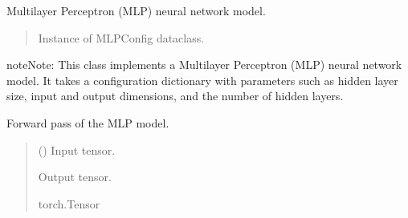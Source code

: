 \documentclass[letterpaper,10pt,english]{sphinxmanual}
\begin{document}
\begin{fulllineitems}
\label{\detokenize{api:hypyml.models.MLP}}
\pysigstartsignatures
{}
\pysigstopsignatures
\sphinxAtStartPar
Multilayer Perceptron (MLP) neural network model.

\begin{fulllineitems}
\label{\detokenize{api:hypyml.models.MLP.config}}
\pysigstartsignatures
{}
\pysigstopsignatures\begin{quote}\begin{description}
\sphinxAtStartPar
Instance of MLPConfig dataclass.

\end{description}\end{quote}

\end{fulllineitems}


\begin{sphinxadmonition}{note}{Note:}
\sphinxAtStartPar
This class implements a Multilayer Perceptron (MLP) neural network model.
It takes a configuration dictionary with parameters such as hidden layer size,
input and output dimensions, and the number of hidden layers.
\end{sphinxadmonition}

\begin{fulllineitems}
\label{\detokenize{api:hypyml.models.MLP.forward}}
\pysigstartsignatures
{}
\pysigstopsignatures
\sphinxAtStartPar
Forward pass of the MLP model.
\begin{quote}\begin{description}
\sphinxAtStartPar
{} () \textendash{} Input tensor.

\sphinxAtStartPar
Output tensor.

\sphinxAtStartPar
torch.Tensor

\end{description}\end{quote}

\end{fulllineitems}


\end{fulllineitems}
\end{document}
